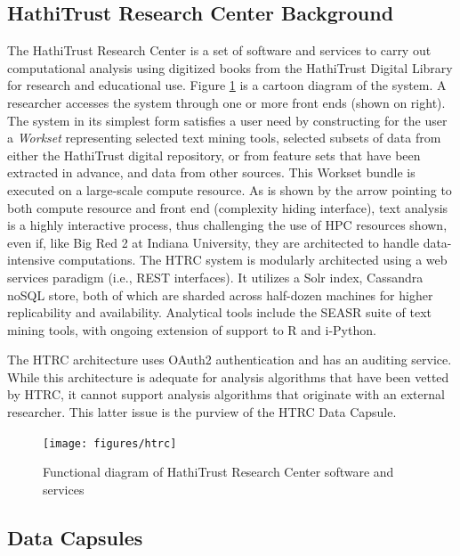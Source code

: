 \documentclass{acm_proc_article-sp}
\begin{document}
\subsection{HathiTrust Research Center Background} \label{subtitle:background}
The HathiTrust Research Center is a set of software and services to carry out computational analysis using digitized books from the HathiTrust Digital Library for research and educational use.
Figure \ref{fig:htrc} is a cartoon diagram of the system.  A researcher accesses the system through one or more front ends (shown on right).  The system in its simplest form satisfies a user need by constructing for the user a \textit{Workset} representing selected text mining tools, selected subsets of data from either the HathiTrust digital repository, or from feature sets that have been extracted in advance, and data from other sources.   This Workset bundle is executed on a large-scale compute resource.   As is shown by the arrow pointing to both compute resource and front end (complexity hiding interface), text analysis is a highly interactive process, thus challenging the use of HPC resources shown, even if, like Big Red 2 at Indiana University, they are architected to handle data-intensive computations.  The HTRC system is modularly architected using a web services paradigm (i.e., REST interfaces).  It utilizes a Solr index, Cassandra noSQL store, both of which are sharded across half-dozen machines for higher replicability and availability.  Analytical tools include the SEASR suite of text mining tools, with ongoing extension of support to R and i-Python.

The HTRC architecture uses OAuth2 authentication and has an auditing service.   While this architecture is adequate for analysis algorithms that have been vetted by HTRC, it cannot support analysis algorithms that originate with an external researcher.  This latter issue is the purview of the HTRC Data Capsule.


\begin{figure}[tbh]
  \centering
  \texttt{[image: figures/htrc]}
  \caption{Functional diagram of HathiTrust Research Center software and services}
  \label{fig:htrc}
\end{figure}

\subsection{Data Capsules}
\end{document}
